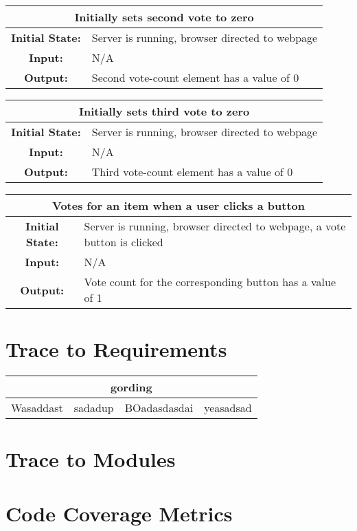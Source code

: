 \documentclass[12pt, titlepage]{article}
\begin{document}
\begin{center}
\begin{table}[H]
\begin{tabularx}{\textwidth}{| c X |}
\hline
\multicolumn{2}{|c|}{\textbf{Initially sets second vote to zero}}\\
\hline
\textbf{Initial State: } & Server is running, browser directed to webpage\\
\textbf{Input: } & N/A\\
\textbf{Output: } & Second vote-count element has a value of 0\\
\hline
\end{tabularx}
\end{table}
\end{center}


\begin{center}
\begin{table}[H]
\begin{tabularx}{\textwidth}{| c X |}
\hline
\multicolumn{2}{|c|}{\textbf{Initially sets third vote to zero}}\\
\hline
\textbf{Initial State: } & Server is running, browser directed to webpage\\
\textbf{Input: } & N/A\\
\textbf{Output: } & Third vote-count element has a value of 0\\
\hline
\end{tabularx}
\end{table}
\end{center}


\begin{center}
\begin{table}[H]
\begin{tabularx}{\textwidth}{| c X |}
\hline
\multicolumn{2}{|c|}{\textbf{Votes for an item when a user clicks a button}}\\
\hline
\textbf{Initial State: } & Server is running, browser directed to webpage, a vote button is clicked\\
\textbf{Input: } & N/A\\
\textbf{Output: } & Vote count for the corresponding button has a value of 1\\
\hline
\end{tabularx}
\end{table}
\end{center}

\section{Trace to Requirements}
\begin{center}
\begin{tabular}{| c | c | c | c |}
\hline
\multicolumn{4}{|c|}{\textbf{gording}}\\
\hline
Wasaddast & sadadup & BOadasdasdai & yeasadsad \\
\hline
\end{tabular}
\end{center}
\section{Trace to Modules}		

\section{Code Coverage Metrics}




\end{document}
